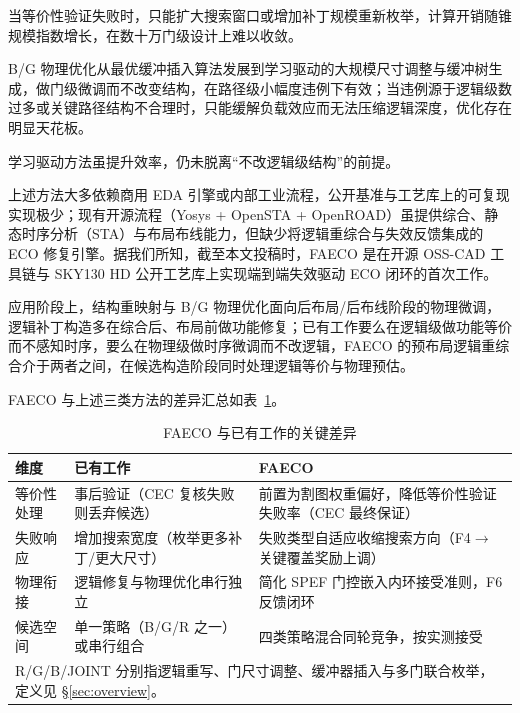 \documentclass[journal]{IEEEtran}
\begin{document}
当等价性验证失败时，只能扩大搜索窗口或增加补丁规模重新枚举\cite{zhuo2018patch}，计算开销随锥规模指数增长，在数十万门级设计上难以收敛。

B/G 物理优化从最优缓冲插入算法\cite{liang2012buffer}发展到学习驱动的大规模尺寸调整与缓冲树生成\cite{liu2021rlsizer,huang2025phys,chen2024aito,zhang2025buffalo}，做门级微调而不改变结构，在路径级小幅度违例下有效；当违例源于逻辑级数过多或关键路径结构不合理时，只能缓解负载效应而无法压缩逻辑深度，优化存在明显天花板\cite{liu2021rlsizer,huang2025phys}。

学习驱动方法\cite{chen2024aito,zhang2025buffalo}虽提升效率，仍未脱离“不改逻辑级结构”的前提。

上述方法大多依赖商用 EDA 引擎或内部工业流程，公开基准与工艺库上的可复现实现极少；现有开源流程（Yosys + OpenSTA + OpenROAD）虽提供综合、静态时序分析（STA）与布局布线能力，但缺少将逻辑重综合与失效反馈集成的 ECO 修复引擎。据我们所知，截至本文投稿时，FAECO 是在开源 OSS-CAD 工具链与 SKY130 HD 公开工艺库上实现端到端失效驱动 ECO 闭环的首次工作。

应用阶段上，结构重映射与 B/G 物理优化面向后布局/后布线阶段的物理微调，逻辑补丁构造多在综合后、布局前做功能修复；已有工作要么在逻辑级做功能等价而不感知时序，要么在物理级做时序微调而不改逻辑，FAECO 的预布局逻辑重综合介于两者之间，在候选构造阶段同时处理逻辑等价与物理预估。

FAECO 与上述三类方法的差异汇总如表~\ref{tab:related_diff}。

\begin{table}[!t]
\centering
\caption{FAECO 与已有工作的关键差异}
\label{tab:related_diff}
\footnotesize
\setlength{\tabcolsep}{3pt}
\begin{tabular}{p{2.2cm}p{2.8cm}p{3.2cm}}
\toprule
\textbf{维度} & \textbf{已有工作} & \textbf{FAECO} \\
\midrule
等价性处理 & 事后验证（CEC 复核失败则丢弃候选） & 前置为割图权重偏好，降低等价性验证失败率（CEC 最终保证） \\
失败响应 & 增加搜索宽度（枚举更多补丁/更大尺寸） & 失败类型自适应收缩搜索方向（F4$\to$关键覆盖奖励上调） \\
物理衔接 & 逻辑修复与物理优化串行独立 & 简化 SPEF 门控嵌入内环接受准则，F6 反馈闭环 \\
候选空间 & 单一策略（B/G/R 之一）或串行组合 & 四类策略混合同轮竞争，按实测接受 \\
\bottomrule
\multicolumn{3}{p{8.0cm}}{\footnotesize R/G/B/JOINT 分别指逻辑重写、门尺寸调整、缓冲器插入与多门联合枚举，定义见 \S\ref{sec:overview}。}\\
\end{tabular}
\end{table}
\end{document}

